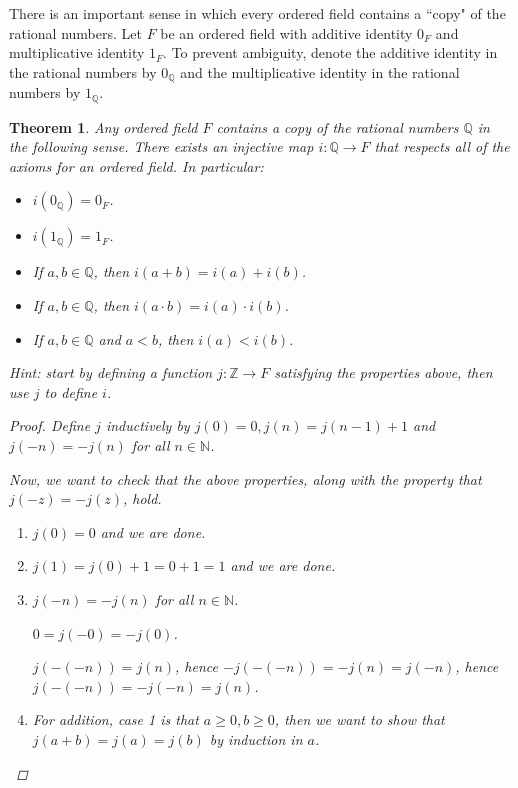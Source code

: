 \documentclass[11pt]{article}
\newcommand{\bbN}{\mathbb{N}}
\newcommand{\bbQ}{\mathbb{Q}}
\newcommand{\bbZ}{\mathbb{Z}}
\newcommand{\arr}{\longrightarrow}
\newtheorem{theorem}{Theorem}[section]
\theoremstyle{definition}
\numberwithin{equation}{subsection}
\begin{document}
There is an important sense in which every ordered field contains a ``copy" of the rational numbers. Let $F$ be an ordered field with additive identity $0_F$ and multiplicative identity $1_F$. To prevent ambiguity, denote the additive identity in the rational numbers by $0_\bbQ$ and the multiplicative identity in the rational numbers by $1_\bbQ$.\medskip



\begin{theorem}
	Any ordered field $F$ contains  a copy of the rational numbers $\bbQ$ in the following sense.  There exists an injective map $i\colon \bbQ \arr F$ that respects all of the axioms for an ordered field. In particular:
	\begin{itemize}
		\item $i(0_\bbQ) = 0_F$.
		\item $i(1_\bbQ) = 1_F$.
		\item If $a, b\in \bbQ$, then $i(a+b) = i(a) + i(b)$.
		\item If $a, b\in \bbQ$, then $i(a\cdot b)=i(a)\cdot i(b)$.
		\item If $a, b\in \bbQ$ and $a < b$, then $i(a)< i(b)$.
	\end{itemize}
	
	    Hint: start by defining a function $j\colon\bbZ\arr F$ satisfying the properties above, then use
    $j$ to define $i$.


\begin{proof}

Define $j$ inductively by $j(0)=0, j(n)=j(n-1)+1$ and $j(-n)=-j(n)$ for all $n \in \bbN$.

Now, we want to check that the above properties, along with the property that $j(-z)=-j(z)$, hold.

\begin{enumerate}
    

\item $j(0)=0$ and we are done.

\item $j(1)=j(0)+1=0+1=1$ and we are done.

\item $j(-n)=-j(n)$ for all $n\in \bbN$.

$0=j(-0)=-j(0)$.

$j(-(-n))=j(n)$, hence $-j(-(-n))=-j(n)=j(-n)$, hence $j(-(-n)) = -j(-n)=j(n)$.

\item For addition, case 1 is that $a\geq 0, b \geq 0$, then we want to show that $j(a+b)=j(a)=j(b)$ by induction in $a$. 


\end{enumerate}
\end{proof}
\end{theorem}
\end{document}
